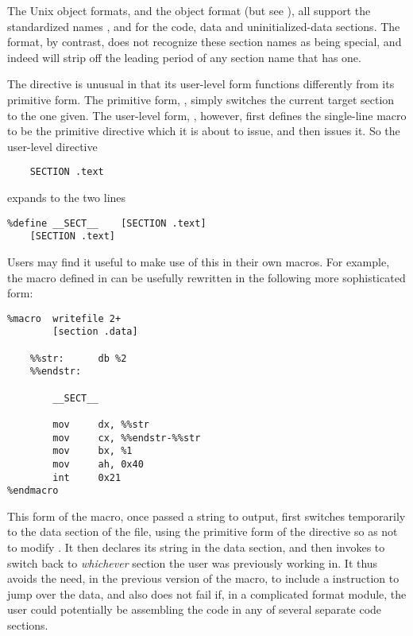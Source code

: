 The Unix object formats, and the  object format (but see
), all support the 
standardized names ,  and  for the code,
data and uninitialized-data sections. The  format, by contrast,
does not recognize these section names as being special, and indeed will
strip off the leading period of any section name that has one.


The  directive is unusual in that its user-level form
functions differently from its primitive form. The primitive form,
, simply switches the current target section to the
one given. The user-level form, , however, first
defines the single-line macro  to be the primitive
\code{[SECTION]} directive which it is about to issue, and then issues
it. So the user-level directive

\begin{lstlisting}
    SECTION .text
\end{lstlisting}

expands to the two lines

\begin{lstlisting}
%define __SECT__    [SECTION .text]
    [SECTION .text]
\end{lstlisting}

Users may find it useful to make use of this in their own macros.
For example, the  macro defined in 
can be usefully rewritten in the following more sophisticated form:

\begin{lstlisting}
%macro  writefile 2+
        [section .data]

    %%str:      db %2
    %%endstr:

        __SECT__

        mov     dx, %%str
        mov     cx, %%endstr-%%str
        mov     bx, %1
        mov     ah, 0x40
        int     0x21
%endmacro
\end{lstlisting}

This form of the macro, once passed a string to output, first
switches temporarily to the data section of the file, using the
primitive form of the  directive so as not to modify
. It then declares its string in the data section,
and then invokes  to switch back to \emph{whichever}
section the user was previously working in. It thus avoids the need,
in the previous version of the macro, to include a  instruction
to jump over the data, and also does not fail if, in a complicated
 format module, the user could potentially be assembling the
code in any of several separate code sections.

